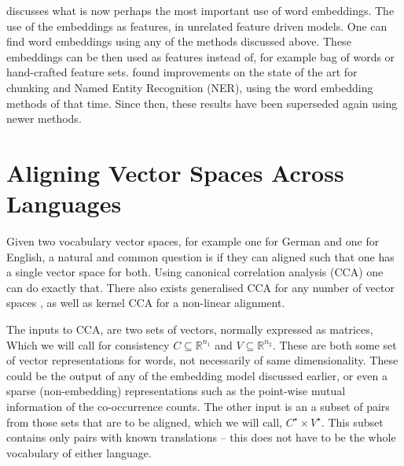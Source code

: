 \documentclass[parskip]{komatufte}
\begin{document}

 discusses what is now perhaps the most important use of word embeddings.
The use of the embeddings as features, in unrelated feature driven models.
One can find word embeddings using any of the methods discussed above.
These embeddings can be then used as features instead of, for example bag of words or hand-crafted feature sets.
\textcite{turian2010word} found improvements on the state of the art for chunking and Named Entity Recognition (NER), using the word embedding methods of that time.
Since then, these results have been superseded again using newer methods.


\section{Aligning Vector Spaces Across Languages}\label{sec:aligning-vector-spaces-across-languages}
Given two vocabulary vector spaces, for example one for German and one for English,
a natural and common question is if they can aligned such that one has a single vector space for both.
Using canonical correlation analysis (CCA) one can do exactly that.
There also exists generalised CCA for any number of vector spaces ,
as well as kernel CCA for a non-linear alignment.

The inputs to CCA, are two sets of vectors, normally expressed as matrices,
Which we will call for consistency $C \subseteq \mathbb{R}^{n_1}$ and $V \subseteq \mathbb{R}^{n_2}$.
These are both some set of vector representations for words, not necessarily of same dimensionality.
These could be the output of any of the embedding model discussed earlier,
or even a sparse (non-embedding) representations such as the point-wise mutual information of the co-occurrence counts.
The other input is an a subset of pairs from those sets that are to be aligned, which we will call, $C^\star \times V^\star$.
This subset contains only pairs with known translations -- this does not have to be the whole vocabulary of either language.
\end{document}
